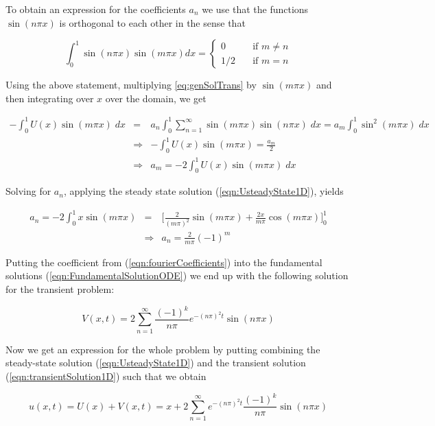 \documentclass{article}
\begin{document}
To obtain an expression for the coefficients $a_n$ we use that the functions $\sin(n\pi x)$ is orthogonal to each other in the sense that 

\begin{equation}
\int_0^1 \sin(n\pi x) \sin(m\pi x) dx = 
\begin{cases} 0 & \quad \text{if } m \neq n\\
1/2 & \quad \text{if } m = n 
\end{cases}
\label{eqn:orhogonalSine}
\end{equation}

Using the above statement, multiplying \ref{eq:genSolTrans} by $\sin(m\pi x)$  and then integrating over $x$ over the domain, we get 

\begin{eqnarray}
\nonumber
- \int_0^1 U(x)\sin(m\pi x)\;dx &=& a_n \int_0^1 \sum_{n=1}^{\infty} \sin(m\pi x)\sin(n\pi x)\;dx = a_m\int_0^1 \sin^2(m\pi x)\;dx\\ \nonumber
&\Rightarrow& - \int_0^1 U(x)\sin(m\pi x) =\frac{a_m}{2}\\ 
&\Rightarrow& a_m = - 2\int_0^1 U(x)\sin(m\pi x) \;dx
\end{eqnarray}

Solving for $a_n$, applying the steady state solution (\ref{eqn:UsteadyState1D}), yields 

\begin{eqnarray}
\nonumber
a_n = -2 \int_0^1 x \sin(m\pi x) &=& \Big[\frac{2}{(m\pi)^2} \sin(m\pi x) + \frac{2x}{m\pi}\cos(m\pi x)\Big]_0^1 \\ 
\label{eqn:fourierCoefficients}
&\Rightarrow & a_n = \frac{2}{m\pi}(-1)^m
\end{eqnarray}
\newline

Putting the coefficient from (\ref{eqn:fourierCoefficients}) into the fundamental solutions (\ref{eqn:FundamentalSolutionODE}) we end up with the following solution for the transient problem:

\begin{equation}
V(x,t) = 2\sum_{n=1}^{\infty} \frac{(-1)^k}{n\pi} e^{-(n\pi)^2 t}\sin(n\pi x)
\label{eqn:transientSolution1D}
\end{equation}

Now we get an expression for the whole problem by putting combining the steady-state solution (\ref{eqn:UsteadyState1D}) and the transient solution (\ref{eqn:transientSolution1D}) such that we obtain 

\begin{equation}
u(x,t) = U(x) + V(x,t) = x + 2\sum_{n=1}^{\infty}e^{-(n\pi)^2 t} \frac{(-1)^k}{n\pi}
\sin(n\pi x)
\label{eqn:solution1D}
\end{equation}
\end{document}
